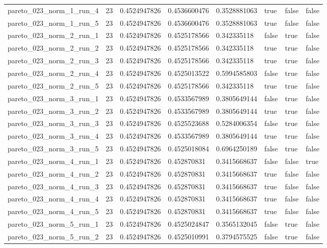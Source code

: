 \begin{tabular}{@{}llllllll@{}}
pareto\_023\_norm\_1\_run\_4 & 23 & 0.4524947826 & 0.4536600476 & 0.3528881063 & true & false & false \\
pareto\_023\_norm\_1\_run\_5 & 23 & 0.4524947826 & 0.4536600476 & 0.3528881063 & true & false & false \\
pareto\_023\_norm\_2\_run\_1 & 23 & 0.4524947826 & 0.4525178566 & 0.342335118 & false & true & false \\
pareto\_023\_norm\_2\_run\_2 & 23 & 0.4524947826 & 0.4525178566 & 0.342335118 & true & true & false \\
pareto\_023\_norm\_2\_run\_3 & 23 & 0.4524947826 & 0.4525178566 & 0.342335118 & true & true & false \\
pareto\_023\_norm\_2\_run\_4 & 23 & 0.4524947826 & 0.4525013522 & 0.5994585803 & false & true & false \\
pareto\_023\_norm\_2\_run\_5 & 23 & 0.4524947826 & 0.4525178566 & 0.342335118 & true & true & false \\
pareto\_023\_norm\_3\_run\_1 & 23 & 0.4524947826 & 0.4533567989 & 0.3805649144 & false & true & false \\
pareto\_023\_norm\_3\_run\_2 & 23 & 0.4524947826 & 0.4533567989 & 0.3805649144 & true & true & false \\
pareto\_023\_norm\_3\_run\_3 & 23 & 0.4524947826 & 0.4525523688 & 0.5284006354 & false & true & false \\
pareto\_023\_norm\_3\_run\_4 & 23 & 0.4524947826 & 0.4533567989 & 0.3805649144 & true & true & false \\
pareto\_023\_norm\_3\_run\_5 & 23 & 0.4524947826 & 0.4525018084 & 0.6964250189 & false & true & false \\
pareto\_023\_norm\_4\_run\_1 & 23 & 0.4524947826 & 0.452870831 & 0.3415668637 & false & false & true \\
pareto\_023\_norm\_4\_run\_2 & 23 & 0.4524947826 & 0.452870831 & 0.3415668637 & true & false & false \\
pareto\_023\_norm\_4\_run\_3 & 23 & 0.4524947826 & 0.452870831 & 0.3415668637 & true & false & false \\
pareto\_023\_norm\_4\_run\_4 & 23 & 0.4524947826 & 0.452870831 & 0.3415668637 & true & false & false \\
pareto\_023\_norm\_4\_run\_5 & 23 & 0.4524947826 & 0.452870831 & 0.3415668637 & true & false & false \\
pareto\_023\_norm\_5\_run\_1 & 23 & 0.4524947826 & 0.4525024847 & 0.3565132045 & false & true & false \\
pareto\_023\_norm\_5\_run\_2 & 23 & 0.4524947826 & 0.4525010991 & 0.3794575525 & false & true & false \\

\end{tabular}
